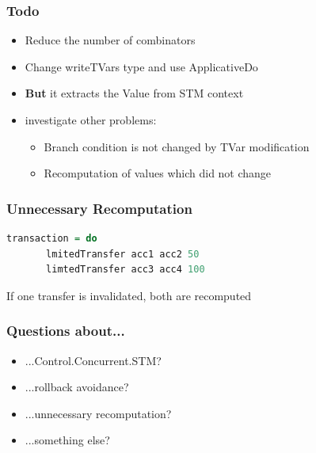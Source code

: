 \documentclass{beamer}
\begin{document}
  
  \begin{frame}
   \frametitle{Todo}
   \begin{itemize}\setlength\itemsep{1em}
    \item Reduce the number of combinators
    \item Change writeTVars type and use ApplicativeDo
    \item \textbf{But} it extracts the Value from STM context
    \item investigate other problems:
      \begin{itemize}
        \item Branch condition is not changed by TVar modification
        \item Recomputation of values which did not change
      \end{itemize}
   \end{itemize}
  \end{frame}

  \begin{frame}[fragile]
    \frametitle{Unnecessary Recomputation}
    \begin{lstlisting}[language=Haskell]
     transaction = do
       lmitedTransfer acc1 acc2 50
       limtedTransfer acc3 acc4 100
    \end{lstlisting}
    \vfill
    If one transfer is invalidated, both are recomputed
\end{frame}


\begin{frame}
 \frametitle{Questions about...}
 \begin{itemize}\setlength\itemsep{1em}
  \item ...Control.Concurrent.STM?
  \item ...rollback avoidance?
  \item ...unnecessary recomputation?
  \item ...something else?
 \end{itemize}

\end{frame}


  
\end{document}
